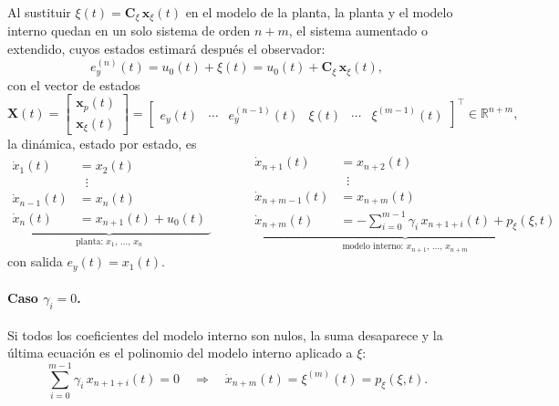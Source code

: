Al sustituir $\xi(t) = \mathbf{C}_{\xi}\,\mathbf{x}_{\xi}(t)$ en el modelo de la
planta, la planta y el modelo interno quedan en un solo sistema de orden $n+m$,
el sistema aumentado o extendido, cuyos estados estimará después el observador:
\begin{equation}
  e_y^{(n)}(t) = u_0(t) + \xi(t) = u_0(t) + \mathbf{C}_{\xi}\,\mathbf{x}_{\xi}(t),
\end{equation}
con el vector de estados
\begin{equation}
\mathbf{X}(t) =
\begin{bmatrix} \mathbf{x}_p(t) \\ \mathbf{x}_{\xi}(t) \end{bmatrix}
=
\begin{bmatrix} e_y(t) & \cdots & e_y^{(n-1)}(t) & \xi(t) & \cdots & \xi^{(m-1)}(t) \end{bmatrix}^{\top}
\in \mathbb{R}^{n+m},
\end{equation}
la dinámica, estado por estado, es
\begin{equation}
\underbrace{
\begin{aligned}
\dot{x}_1(t) &= x_2(t) \\
&\;\;\vdots \\
\dot{x}_{n-1}(t) &= x_n(t) \\
\dot{x}_n(t) &= x_{n+1}(t) + u_0(t)
\end{aligned}}_{\text{planta: } x_1,\,\dots,\,x_n}
\qquad\quad
\underbrace{
\begin{aligned}
\dot{x}_{n+1}(t) &= x_{n+2}(t) \\
&\;\;\vdots \\
\dot{x}_{n+m-1}(t) &= x_{n+m}(t) \\
\dot{x}_{n+m}(t) &= -\textstyle\sum_{i=0}^{m-1}\gamma_i\,x_{n+1+i}(t) + p_{\xi}(\xi,t)
\end{aligned}}_{\text{modelo interno: } x_{n+1},\,\dots,\,x_{n+m}}
\end{equation}
con salida $e_y(t) = x_1(t)$.

\paragraph{Caso $\gamma_i = 0$.} Si todos los coeficientes del modelo interno son
nulos, la suma desaparece y la última ecuación es el polinomio del modelo interno
aplicado a $\xi$:
\begin{equation}
\textstyle\sum_{i=0}^{m-1}\gamma_i\,x_{n+1+i}(t) = 0
\quad\Longrightarrow\quad
\dot{x}_{n+m}(t) = \xi^{(m)}(t) = p_{\xi}(\xi,t) .
\end{equation}

